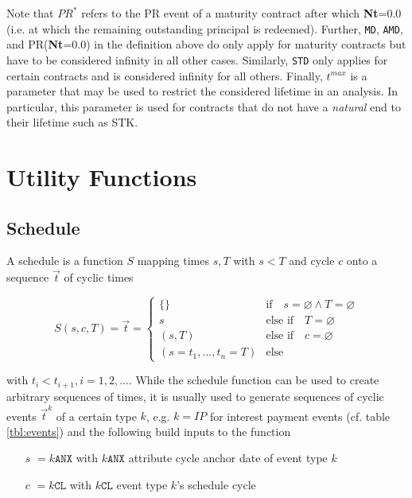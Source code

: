 \documentclass[9pt,oneside]{amsart}
\newcommand{\attr}[1]{\texttt{#1}}
\newcommand{\sdl}[3]{S(#1,#2,#3)}
\newcommand{\undef}{\varnothing}
\newcommand{\tmax}{t^{max}}
\begin{document}
\begin{multicols}{2}
Note that $PR^*$ refers to the PR event of a maturity contract after which \textbf{Nt}=0.0 (i.e. at which the remaining outstanding principal is redeemed). Further, \attr{MD}, \attr{AMD}, and PR(\textbf{Nt}=0.0) in the definition above do only apply for maturity contracts but have to be considered infinity in all other cases. Similarly, \attr{STD} only applies for certain contracts and is considered infinity for all others. Finally, $\tmax$ is a parameter that may be used to restrict the considered lifetime in an analysis. In particular, this parameter is used for contracts that do not have a \textit{natural} end to their lifetime such as STK.



\section{Utility Functions}\label{sec:utils}


\subsection{Schedule}\label{sec:schedule}

A schedule is a function $S$ mapping times $s,T$ with $s<T$ and cycle $c$ onto a sequence $\vec{t}$ of cyclic times

\[
	\sdl{s}{c}{T}=\vec{t}=\begin{cases} \{\} & \text{if}\quad s=\undef\land T=\undef\\
					s & \text{else if}\quad T=\undef\\
					(s,T) & \text{else if}\quad c=\undef\\
					(s=t_1,...,t_n=T) & \text{else} \end{cases}
\]

with $t_i<t_{i+1}, i=1,2,...$. While the schedule function can be used to create arbitrary sequences of times, it is usually used to generate sequences of cyclic events $\vec{t}^k$ of a certain type $k$, e.g. $k=IP$ for interest payment events (cf. table \ref{tbl:events}) and the following build inputs to the function

\begin{itemize}
	\item[$s$] $=k\attr{ANX}$ with $k\attr{ANX}$ attribute cycle anchor date of event type $k$

	\item[$c$] $=k\attr{CL}$ with $k\attr{CL}$ event type $k$'s schedule cycle


\end{itemize}
\end{multicols}
\end{document}
